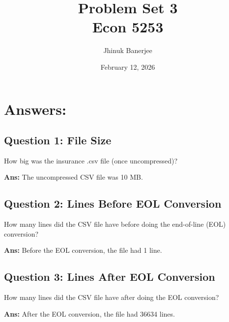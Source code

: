 \documentclass[12pt]{article}
\title{\textbf{Problem Set 3} \\Econ 5253}
\author{Jhinuk Banerjee}
\date{February 12, 2026}
\begin{document}
\maketitle

\section*{Answers: }

\subsection*{Question 1: File Size}
How big was the insurance .csv file (once uncompressed)?

\textbf{Ans:} The uncompressed CSV file was 10 MB.

\subsection*{Question 2: Lines Before EOL Conversion}
How many lines did the CSV file have before doing the end-of-line (EOL) conversion?

\textbf{Ans:} Before the EOL conversion, the file had 1 line.

\subsection*{Question 3: Lines After EOL Conversion}
How many lines did the CSV file have after doing the EOL conversion?

\textbf{Ans:} After the EOL conversion, the file had 36634 lines.
\end{document}
